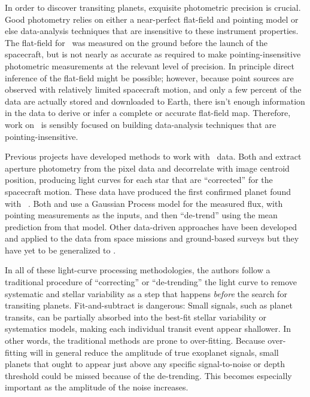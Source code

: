 \documentclass[12pt,preprint]{aastex}
\begin{document}
In order to discover transiting planets, exquisite photometric precision is
crucial.
Good photometry relies on either a near-perfect flat-field
and pointing model or else data-analysis techniques that are
insensitive to these instrument properties.
The flat-field for \kepler\ was measured on the ground before the launch of
the spacecraft, but is not nearly as accurate as required to make
pointing-insensitive photometric measurements at the relevant level of
precision.
In principle direct inference of the flat-field might be possible;
however, because point sources are observed with relatively limited
spacecraft motion, and only a few percent of the data are actually stored and
downloaded to Earth, there isn't enough information in the data to derive or
infer a complete or accurate flat-field map.
Therefore, work on \KT\ is sensibly focused on building data-analysis
techniques that are pointing-insensitive.

Previous projects have developed methods to work with \KT\ data.
Both \citet{Vanderburg:2014} and \citet{Armstrong:2014}
extract aperture photometry from the pixel data
and decorrelate with image centroid position, producing light curves for each
star that are ``corrected'' for the spacecraft motion.
These data have produced the first confirmed planet found with
\KT\ \citep{Vanderburg:2015}.
Both \citet{Aigrain:2015} and \citet{Crossfield:2015} use a Gaussian Process
model for the measured flux, with pointing measurements as the inputs, and
then ``de-trend'' using the mean prediction from that model.
Other data-driven approaches have been developed and applied to the data from
space missions \citep[for example,][]{Ofir:2010, Stumpe:2012, Smith:2012,
Petigura:2013, Wang:2015} and ground-based surveys \citep[for
example,][]{Kovacs:2005, Tamuz:2005, Berta:2012} but they have yet to be
generalized to \KT.

In all of these light-curve processing methodologies, the authors follow a
traditional procedure of ``correcting'' or ``de-trending'' the light curve to
remove systematic and stellar variability as a step that happens \emph{before}
the search for transiting planets.
Fit-and-subtract is dangerous:
Small signals, such as planet transits, can be
partially absorbed into the best-fit stellar variability or systematics
models, making each individual transit event appear shallower.
In other words, the traditional methods are prone to over-fitting.
Because over-fitting will in general reduce the amplitude of true exoplanet
signals, small planets that ought to appear just above any specific
signal-to-noise or depth threshold could be missed because of the de-trending.
This becomes especially important as the amplitude of the noise increases.
\end{document}
